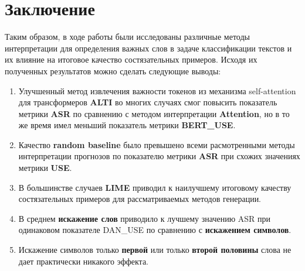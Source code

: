 \section{Заключение}
\label{sec:Conclusion} 

\noindent\hspace{0.6cm}Таким образом, в ходе работы были исследованы различные методы интерпретации для определения важных слов в задаче классификации текстов и их влияние на итоговое качество состязательных примеров. Исходя их полученных результатов можно сделать следующие выводы:

\begin{enumerate}
    \item Улучшенный метод извлечения важности токенов из механизма self-attention для трансформеров \textbf{ALTI} во многих случаях смог повысить показатель метрики \textbf{ASR} по сравнению с методом интерпретации \textbf{Attention}, но в то же время имел меньший показатель метрики \textbf{BERT\_USE}.
    \item Качество \textbf{random baseline} было превышено всеми расмотренными методы интерпретации прогнозов по показателю метрики \textbf{ASR} при схожих значениях метрики \textbf{USE}.
    \item В большинстве случаев \textbf{LIME} приводил к наилучшему итоговому качеству состязательных примеров для рассматриваемых методов генерации.
    \item В среднем \textbf{искажение слов} приводило к лучшему значению ASR при одинаковом показателе DAN\_USE по сравнению с \textbf{искажением символов}.
    \item Искажение символов только \textbf{первой} или только \textbf{второй половины} слова не дает практически никакого эффекта.
\end{enumerate}